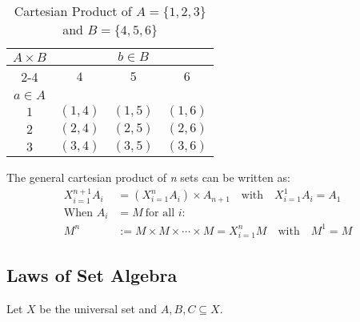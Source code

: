 \begin{table}[H]
	\centering
	\caption{Cartesian Product of \(A = \{1, 2, 3\}\) and \(B = \{4, 5, 6\}\)}
	\begin{tabular}{|c|c|c|c|}
		\hline
		\multirow{3}{*}{\(A \times B\)} & \multicolumn{3}{c|}{\(b \in B\)}                       \\
		\cline{2-4}
		                              & \(4\)                            & \(5\)      & \(6\)      \\
		\hline
		\(a \in A\)                     &                                &          &          \\
		\hline
		\(1\)                           & \((1, 4)\)                       & \((1, 5)\) & \((1, 6)\) \\
		\hline
		\(2\)                           & \((2, 4)\)                       & \((2, 5)\) & \((2, 6)\) \\
		\hline
		\(3\)                           & \((3, 4)\)                       & \((3, 5)\) & \((3, 6)\) \\
		\hline
	\end{tabular}
	\label{tab:cartesian_product}
\end{table}

The general cartesian product of \emph{n} sets can be written as:
\begin{align*}
	X_{i = 1}^{n + 1} A_i & = \left( X_{i = 1}^{n} A_i \right) \times A_{n + 1} \quad \text{with} \quad X_{i = 1}^{1} A_i = A_1 \\
	\text{When } A_i      & = M \ \text{for all } i:                                                                            \\
	M^n                   & := M \times M \times \cdots \times M = X_{i = 1}^{n} M \quad \text{with} \quad M^1 = M
\end{align*}

\subsection{Laws of Set Algebra}
Let \(X\) be the universal set and \(A, B, C \subseteq X\).

